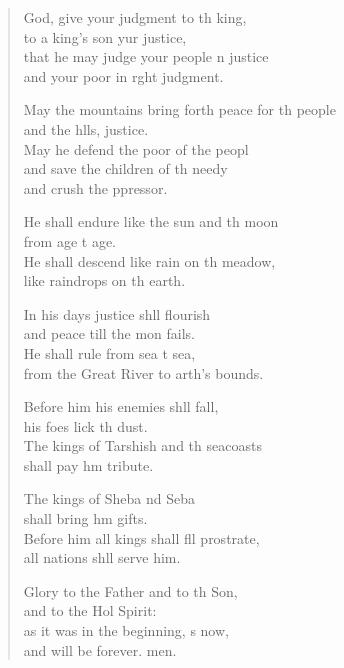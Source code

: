 \settowidth{\versewidth}{May the mountains bring forth peace for the people *}
\begin{verse}%
  \begin{patverse}
 God, give your judgment to th king,\Med\\
to a king’s son yur justice,\\
that he may judge your people \pointup{\i}n justice\Med\\
and your poor in r\pointup{\i}ght judgment.

May the mountains bring forth peace for th people\Med\\
and the h\pointup{\i}lls, justice.\\
May he defend the poor of the peopl\Flex\\
and save the children of th needy\Med\\
and crush the ppressor.

He shall endure like the sun and th moon\Med\\
from age t age.\\
He shall descend like rain on th meadow,\Med\\
like raindrops on th earth.

In his days justice shll flourish\Med\\
and peace till the mon fails.\\
He shall rule from sea t sea,\Med\\
from the Great River to arth’s bounds.

Before him his enemies shll fall,\Med\\
his foes lick th dust.\\
The kings of Tarshish and th seacoasts\Med\\
shall pay h\pointup{\i}m tribute.

The kings of Sheba nd Seba\Med\\
shall bring h\pointup{\i}m gifts.\\
Before him all kings shall fll prostrate,\Med\\
all nations shll serve him.

Glory to the Father and to th Son,\Med\\
and to the Hol Spirit:\\
as it was in the beginning, \pointup{\i}s now,\Med\\
and will be forever. men.
  \end{patverse}
\end{verse}
